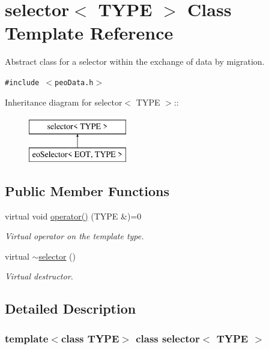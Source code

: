 \hypertarget{classselector}{
\section{selector$<$ TYPE $>$ Class Template Reference}
\label{classselector}
}
Abstract class for a selector within the exchange of data by migration.  


{\tt \#include $<$peo\-Data.h$>$}

Inheritance diagram for selector$<$ TYPE $>$::\begin{figure}[H]
\begin{center}
\leavevmode
\includegraphics[height=2cm]{classselector}
\end{center}
\end{figure}
\subsection*{Public Member Functions}
\begin{CompactItemize}
\item 
virtual void \hyperlink{classselector_3ca409d57262f397263541753c7fcc28}{operator()} (TYPE \&)=0
\begin{CompactList}\small\item\em Virtual operator on the template type. \item\end{CompactList}\item 
\hypertarget{classselector_59a14168e5c0b3f5f4fcab076f4efd2b}{
virtual \hyperlink{classselector_59a14168e5c0b3f5f4fcab076f4efd2b}{$\sim$selector} ()}
\label{classselector_59a14168e5c0b3f5f4fcab076f4efd2b}

\begin{CompactList}\small\item\em Virtual destructor. \item\end{CompactList}\end{CompactItemize}


\subsection{Detailed Description}
\subsubsection*{template$<$class TYPE$>$ class selector$<$ TYPE $>$}

